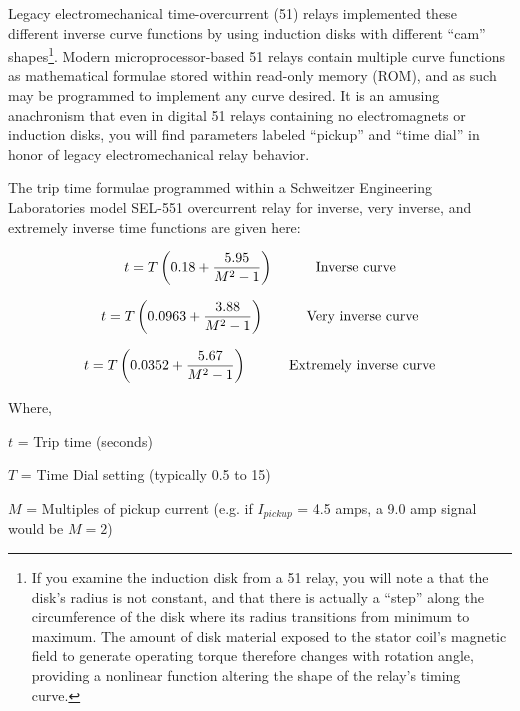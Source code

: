 Legacy electromechanical time-overcurrent (51) relays implemented these different inverse curve functions by using induction disks with different ``cam'' shapes\footnote{If you examine the induction disk from a 51 relay, you will note a that the disk's radius is not constant, and that there is actually a ``step'' along the circumference of the disk where its radius transitions from minimum to maximum.  The amount of disk material exposed to the stator coil's magnetic field to generate operating torque therefore changes with rotation angle, providing a nonlinear function altering the shape of the relay's timing curve.}.  Modern microprocessor-based 51 relays contain multiple curve functions as mathematical formulae stored within read-only memory (ROM), and as such may be programmed to implement any curve desired.  It is an amusing anachronism that even in digital 51 relays containing no electromagnets or induction disks, you will find parameters labeled ``pickup'' and ``time dial'' in honor of legacy electromechanical relay behavior.

The trip time formulae programmed within a Schweitzer Engineering Laboratories model SEL-551 overcurrent relay for inverse, very inverse, and extremely inverse time functions are given here:  

$$t = T \left(0.18 + {5.95 \over {M^2 - 1}} \right) \hskip 30pt \hbox{Inverse curve}$$

$$t = T \left(0.0963 + {3.88 \over {M^2 - 1}} \right) \hskip 30pt \hbox{Very inverse curve}$$

$$t = T \left(0.0352 + {5.67 \over {M^2 - 1}} \right) \hskip 30pt \hbox{Extremely inverse curve}$$

\noindent
Where,

$t$ = Trip time (seconds)

$T$ = Time Dial setting (typically 0.5 to 15)

$M$ = Multiples of pickup current (e.g. if $I_{pickup}$ = 4.5 amps, a 9.0 amp signal would be $M = 2$)












